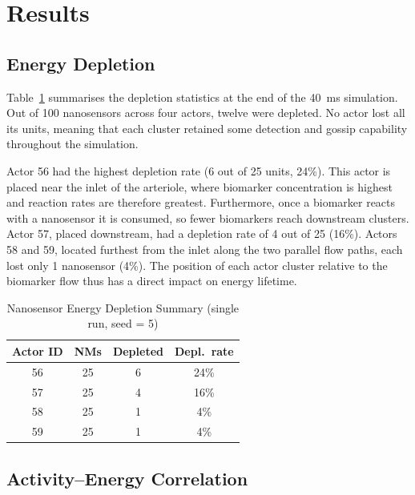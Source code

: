 \documentclass[journal]{IEEEtran}
\begin{document}
\section{Results}
\label{sec:results}

\subsection{Energy Depletion}

Table~\ref{tab:depletion} summarises the depletion statistics at the end of
the 40~ms simulation. Out of 100 nanosensors across four actors, twelve were
depleted. No actor lost all its units, meaning that each cluster retained some
detection and gossip capability throughout the simulation.

Actor 56 had the highest depletion rate (6 out of 25 units, 24\%). This actor
is placed near the inlet of the arteriole, where biomarker concentration is
highest and reaction rates are therefore greatest. Furthermore, once a biomarker
reacts with a nanosensor it is consumed, so fewer biomarkers reach downstream
clusters. Actor 57, placed downstream, had a depletion rate of 4 out of 25
(16\%). Actors 58 and 59, located furthest from the inlet along the two
parallel flow paths, each lost only 1 nanosensor (4\%). The position of each
actor cluster relative to the biomarker flow thus has a direct impact on energy
lifetime.

\begin{table}[!t]
\renewcommand{\arraystretch}{1.3}
\caption{Nanosensor Energy Depletion Summary (single run, seed = 5)}
\label{tab:depletion}
\centering
\begin{tabular}{cccc}
\hline
\textbf{Actor ID} & \textbf{NMs} & \textbf{Depleted} & \textbf{Depl.\ rate} \\
\hline
56 & 25 & 6 & 24\% \\
57 & 25 & 4 & 16\% \\
58 & 25 & 1 &  4\% \\
59 & 25 & 1 &  4\% \\
\hline
\end{tabular}
\end{table}

\subsection{Activity--Energy Correlation}
\end{document}

